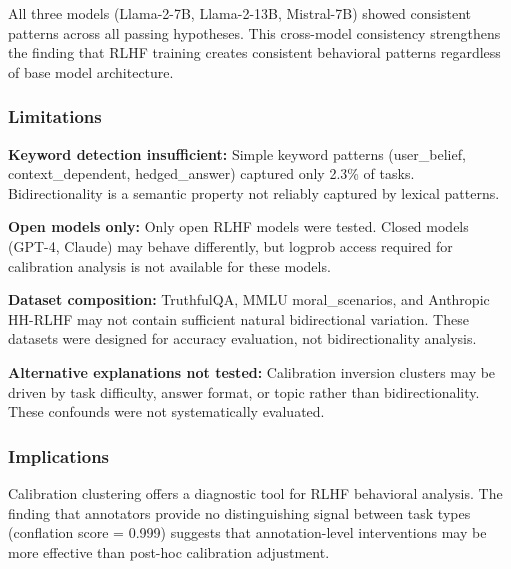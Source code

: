 All three models (Llama-2-7B, Llama-2-13B, Mistral-7B) showed consistent patterns across all passing hypotheses. This cross-model consistency strengthens the finding that RLHF training creates consistent behavioral patterns regardless of base model architecture.

\subsubsection{Limitations}

\textbf{Keyword detection insufficient:} Simple keyword patterns (user\_belief, context\_dependent, hedged\_answer) captured only 2.3\% of tasks. Bidirectionality is a semantic property not reliably captured by lexical patterns.

\textbf{Open models only:} Only open RLHF models were tested. Closed models (GPT-4, Claude) may behave differently, but logprob access required for calibration analysis is not available for these models.

\textbf{Dataset composition:} TruthfulQA, MMLU moral\_scenarios, and Anthropic HH-RLHF may not contain sufficient natural bidirectional variation. These datasets were designed for accuracy evaluation, not bidirectionality analysis.

\textbf{Alternative explanations not tested:} Calibration inversion clusters may be driven by task difficulty, answer format, or topic rather than bidirectionality. These confounds were not systematically evaluated.

\subsubsection{Implications}

Calibration clustering offers a diagnostic tool for RLHF behavioral analysis. The finding that annotators provide no distinguishing signal between task types (conflation score = 0.999) suggests that annotation-level interventions may be more effective than post-hoc calibration adjustment.
